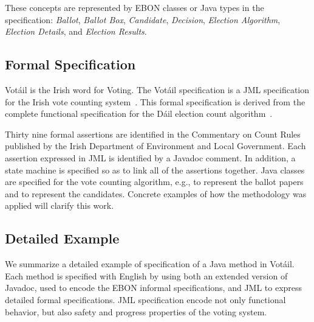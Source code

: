 \documentclass[letterpaper,twocolumn,10pt]{article}
\newcommand{\Votail}{Vot{\'a}il\xspace}
\begin{document}
These concepts are represented by EBON classes or Java types in the
specification: \emph{Ballot}, \emph{Ballot Box}, \emph{Candidate},
\emph{Decision}, \emph{Election Algorithm}, \emph{Election Details},
and \emph{Election Results}.

\subsection{Formal Specification}

\Votail is the Irish word for Voting.  The \Votail specification is a
JML specification for the Irish vote counting system~\cite{Cochran06}.
This formal specification is derived from the complete functional
specification for the D{\'a}il election count
algorithm~\cite{CEV00,CEV02}.

Thirty nine formal assertions are identified in the Commentary on
Count Rules published by the Irish Department of Environment and Local
Government.  Each assertion expressed in JML is identified by a
Javadoc comment.  In addition, a state machine is specified so as to
link all of the assertions together.  Java classes are specified
for the vote counting algorithm, e.g., to represent the ballot papers
and to represent the candidates.  Concrete examples of how the
methodology was applied will clarify this work.

\subsection{Detailed Example}

We summarize a detailed example of specification of a Java
method in \Votail.  Each method is specified with English by using
both an extended version of Javadoc, used to encode the EBON informal
specifications, and JML to express detailed formal specifications.
JML specification encode not only functional behavior, but also safety
and progress properties of the voting system.


\end{document}
